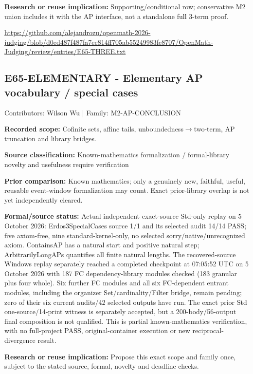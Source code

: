 \documentclass[11pt,a4paper]{article}
\begin{document}
\textbf{Research or reuse implication:} Supporting/conditional row; conservative M2 union includes it with the AP interface, not a standalone full 3-term proof.

{\small \url{https://github.com/alejandrozu/openmath-2026-judging/blob/d0ed487f487fa7ec814ff705ab55249983fe8707/OpenMath-Judging/review/entries/E65-THREE.txt}\par}

\begin{samepage}
\subsection{E65-ELEMENTARY  -  Elementary AP vocabulary / special cases}
{\small Contributors: Wilson Wu | Family: M2-AP-CONCLUSION\par}

\textbf{Recorded scope:} Cofinite sets, affine tails, unboundedness\ensuremath{\to}two-term, AP truncation and library bridges.

\end{samepage}
\textbf{Source classification:} Known-mathematics formalization / formal-library novelty and usefulness require verification

\textbf{Prior comparison:} Known mathematics; only a genuinely new, faithful, useful, reusable event-window formalization may count. Exact prior-library overlap is not yet independently cleared.

\begin{samepage}
\textbf{Formal/source status:} Actual independent exact-source Std-only replay on 5 October 2026: Erdos3SpecialCases source 1/1 and its selected audit 14/14 PASS; five axiom-free, nine standard-kernel-only, no selected sorry/native/unrecognized axiom. ContainsAP has a natural start and positive natural step; ArbitrarilyLongAPs quantifies all finite natural lengths. The recovered-source Windows replay separately reached a completed checkpoint at 07:05:52 UTC on 5 October 2026 with 187 FC dependency-library modules checked (183 granular plus four whole). Six further FC modules and all six FC-dependent entrant modules, including the organizer Set/cardinality/Filter bridge, remain pending; zero of their six current audits/42 selected outputs have run. The exact prior Std one-source/14-print witness is separately accepted, but a 200-body/56-output final composition is not qualified. This is partial known-mathematics verification, with no full-project PASS, original-container execution or new reciprocal-divergence result.

\end{samepage}
\textbf{Research or reuse implication:} Propose this exact scope and family once, subject to the stated source, formal, novelty and deadline checks.
\end{document}
